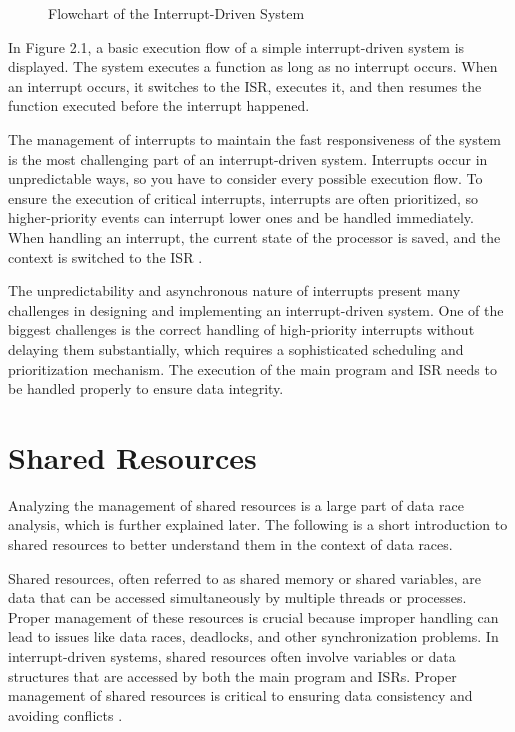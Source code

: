 \documentclass[
fancyheadings, %
%
%
]{stsreprt}
\begin{document}
{\begin{figure}[H]
\begin{tikzpicture}[node distance=2cm, scale=0.8, transform shape]
			\end{tikzpicture}
			\caption{Flowchart of the Interrupt-Driven System}
		\end{figure}
		
		In Figure 2.1, a basic execution flow of a simple interrupt-driven system is displayed. The system executes a function as long as no interrupt occurs. When an interrupt occurs, it switches to the \ac{ISR}, executes it, and then resumes the function executed before the interrupt happened.
		
		The management of interrupts to maintain the fast responsiveness of the system is the most challenging part of an interrupt-driven system. Interrupts occur in unpredictable ways, so you have to consider every possible execution flow. To ensure the execution of critical interrupts, interrupts are often prioritized, so higher-priority events can interrupt lower ones and be handled immediately. When handling an interrupt, the current state of the processor is saved, and the context is switched to the \ac{ISR} \cite{wang2020}.
		
		The unpredictability and asynchronous nature of interrupts present many challenges in designing and implementing an interrupt-driven system. One of the biggest challenges is the correct handling of high-priority interrupts without delaying them substantially, which requires a sophisticated scheduling and prioritization mechanism. The execution of the main program and \ac{ISR} needs to be handled properly to ensure data integrity. 
		
		\section{Shared Resources}
		Analyzing the management of shared resources is a large part of data race analysis, which is further explained later. The following is a short introduction to shared resources to better understand them in the context of data races.
		
		Shared resources, often referred to as shared memory or shared variables, are data that can be accessed simultaneously by multiple threads or processes. Proper management of these resources is crucial because improper handling can lead to issues like data races, deadlocks, and other synchronization problems. In interrupt-driven systems, shared resources often involve variables or data structures that are accessed by both the main program and \acp{ISR}. Proper management of shared resources is critical to ensuring data consistency and avoiding conflicts \cite{herlihy2008}.
		
}
\end{document}
